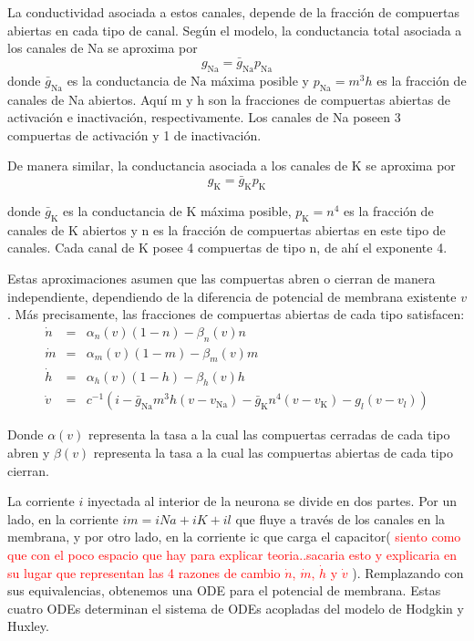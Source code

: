 \documentclass[aps,prl,twocolumn,groupedaddress]{revtex4-2}
\begin{document}
La conductividad asociada a estos canales, depende de la fracción de compuertas abiertas en cada tipo de canal. Según el modelo, la conductancia total asociada a los canales de Na se aproxima por
$$g_{\mathrm{Na}} = \bar{g}_{\mathrm{Na}}p_{\mathrm{Na}}$$
donde $\bar{g}_{\mathrm{Na}}$ es la conductancia de $\mathrm{Na}$ máxima posible y $p_{\mathrm{Na}} = m^3h$  es la fracción de canales de Na abiertos. Aquí m y h son la fracciones de compuertas abiertas de activación e inactivación, respectivamente. Los canales de Na poseen 3 compuertas de activación y 1 de inactivación.

De manera similar, la conductancia asociada a los canales de K se aproxima por
$$g_{\mathrm{K}} = \bar{g}_{\mathrm{K}}p_{\mathrm{K}}$$

donde $\bar{g}_{\mathrm{K}}$  es la conductancia de K máxima posible, $p_{\mathrm{K}} = n^4$ es la fracción de canales de K abiertos y n es la fracción de compuertas abiertas en este tipo de canales. Cada canal de K posee 4 compuertas de tipo n, de ahí el exponente 4.

Estas aproximaciones asumen que las compuertas abren o cierran de manera independiente, dependiendo de la diferencia de potencial de membrana existente $v$. Más precisamente, las fracciones de compuertas abiertas de cada tipo satisfacen:
\begin{eqnarray*}
\dot{n}&=&\alpha_n(v)(1-n)-\beta_n(v) n\\
\dot{m}&=&\alpha_m(v)(1-m)-\beta_m(v) m\\
\dot{h}&=&\alpha_h(v)(1-h)-\beta_h(v) h\\
\dot{v}&=&c^{-1}(i-\bar{g}_{\mathrm{Na}}m^3h(v-v_{\mathrm{Na}})-\bar{g}_{\mathrm{K}}n^4(v-v_{\mathrm{K}})-g_{l}(v-v_{l}))
\end{eqnarray*}

Donde $\alpha(v)$ representa la tasa a la cual las compuertas cerradas de cada tipo abren y $\beta(v)$ representa la tasa a la cual las compuertas abiertas de cada tipo cierran.

La corriente $i$ inyectada al interior de la neurona se divide en dos partes. Por un lado, en la corriente  $im=iNa+iK+il$  que fluye a través de los canales en la membrana, y por otro lado, en la corriente  ic  que carga el capacitor( \textcolor{red}{siento como que con el poco espacio que hay para explicar teoria..sacaria esto y explicaria en su lugar que representan las 4 razones de cambio $\dot{n}$, $\dot{m}$, $\dot{h}$ y $\dot{v}$ }).
Remplazando con sus equivalencias, obtenemos una ODE para el potencial de membrana.
Estas cuatro ODEs determinan el sistema de ODEs acopladas del modelo de Hodgkin y Huxley.
\end{document}
